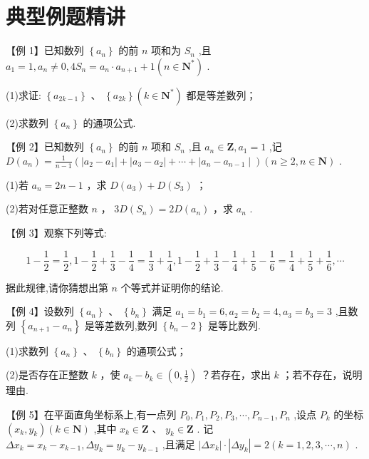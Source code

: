 \section*{典型例题精讲}

【例 1】已知数列 $\left\{  {a}_{n}\right\}$ 的前 $n$ 项和为 ${S}_{n}$ ,且 ${a}_{1} = 1,{a}_{n} \neq  0,4{S}_{n} = {a}_{n} \cdot  {a}_{n + 1} + 1\left( {n \in  {\mathbf{N}}^{ * }}\right)$ .

(1)求证: $\left\{  {a}_{{2k} - 1}\right\}$ 、 $\left\{  {a}_{2k}\right\}  \left( {k \in  {\mathbf{N}}^{ * }}\right)$ 都是等差数列；

(2)求数列 $\left\{  {a}_{n}\right\}$ 的通项公式.

【例 2】已知数列 $\left\{  {a}_{n}\right\}$ 的前 $n$ 项和 ${S}_{n}$ ,且 ${a}_{n} \in  \mathbf{Z},{a}_{1} = 1$ ,记 $D\left( {a}_{n}\right)  = \frac{1}{n - 1}\left( {\left| {{a}_{2} - {a}_{1}}\right|  + \left| {{a}_{3} - {a}_{2}}\right|  + \cdots  + }\right.  \left. {\mid {a}_{n} - {a}_{n - 1} \mid  }\right) \left( {n \geq  2,n \in  \mathbf{N}}\right)$ .

(1)若 ${a}_{n} = {2n} - 1$ ，求 $D\left( {a}_{3}\right)  + D\left( {S}_{3}\right)$ ；

(2)若对任意正整数 $n$ ， ${3D}\left( {S}_{n}\right)  = {2D}\left( {a}_{n}\right)$ ，求 ${a}_{n}$ .

【例 3】观察下列等式:

\[
1 - \frac{1}{2} = \frac{1}{2},1 - \frac{1}{2} + \frac{1}{3} - \frac{1}{4} = \frac{1}{3} + \frac{1}{4},1 - \frac{1}{2} + \frac{1}{3} - \frac{1}{4} + \frac{1}{5} - \frac{1}{6} = \frac{1}{4} + \frac{1}{5} + \frac{1}{6},\cdots
\]

据此规律,请你猜想出第 $n$ 个等式并证明你的结论.

【例 4】设数列 $\left\{  {a}_{n}\right\}  \text{ 、 }\left\{  {b}_{n}\right\}$ 满足 ${a}_{1} = {b}_{1} = 6,{a}_{2} = {b}_{2} = 4,{a}_{3} = {b}_{3} = 3$ ,且数列 $\left\{  {{a}_{n + 1} - {a}_{n}}\right\}$ 是等差数列,数列 $\left\{  {{b}_{n} - 2}\right\}$ 是等比数列.

(1)求数列 $\left\{  {a}_{n}\right\}$ 、 $\left\{  {b}_{n}\right\}$ 的通项公式；

(2)是否存在正整数 $k$ ，使 ${a}_{k} - {b}_{k} \in  \left( {0,\frac{1}{2}}\right)$ ？若存在，求出 $k$ ；若不存在，说明理由.

【例 5】在平面直角坐标系上,有一点列 ${P}_{0},{P}_{1},{P}_{2},{P}_{3},\cdots ,{P}_{n - 1},{P}_{n}$ ,设点 ${P}_{k}$ 的坐标 $\left( {{x}_{k},{y}_{k}}\right) \left( {k \in  \mathbf{N}}\right)$ ,其中 ${x}_{k} \in  \mathbf{Z}$ 、 ${y}_{k} \in  \mathbf{Z}$ . 记 $\Delta {x}_{k} = {x}_{k} - {x}_{k - 1},\Delta {y}_{k} = {y}_{k} - {y}_{k - 1}$ ,且满足 $\left| {\Delta {x}_{k}}\right|  \cdot  \left| {\Delta {y}_{k}}\right|  = 2\left( {k = 1,2,3,\cdots ,n}\right)$ .

